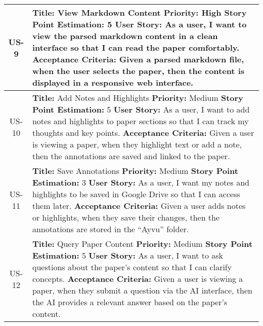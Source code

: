 \documentclass[12pt]{article}
\begin{document}
\begin{longtable}{|c|p{15cm}|}
  \hline
  US-9 &
  \textbf{Title:} View Markdown Content \newline
  \textbf{Priority:} High \newline
  \textbf{Story Point Estimation:} 5 \newline
  \textbf{User Story:} As a user, I want to view the parsed markdown content in a clean interface so that I can read the paper comfortably. \newline
  \textbf{Acceptance Criteria:} Given a parsed markdown file, when the user selects the paper, then the content is displayed in a responsive web interface. \\

  \hline
  US-10 &
  \textbf{Title:} Add Notes and Highlights \newline
  \textbf{Priority:} Medium \newline
  \textbf{Story Point Estimation:} 5 \newline
  \textbf{User Story:} As a user, I want to add notes and highlights to paper sections so that I can track my thoughts and key points. \newline
  \textbf{Acceptance Criteria:} Given a user is viewing a paper, when they highlight text or add a note, then the annotations are saved and linked to the paper. \\

  \hline
  US-11 &
  \textbf{Title:} Save Annotations \newline
  \textbf{Priority:} Medium \newline
  \textbf{Story Point Estimation:} 3 \newline
  \textbf{User Story:} As a user, I want my notes and highlights to be saved in Google Drive so that I can access them later. \newline
  \textbf{Acceptance Criteria:} Given a user adds notes or highlights, when they save their changes, then the annotations are stored in the ``Ayvu'' folder. \\

  \hline
  US-12 &
  \textbf{Title:} Query Paper Content \newline
  \textbf{Priority:} Medium \newline
  \textbf{Story Point Estimation:} 5 \newline
  \textbf{User Story:} As a user, I want to ask questions about the paper's content so that I can clarify concepts. \newline
  \textbf{Acceptance Criteria:} Given a user is viewing a paper, when they submit a question via the AI interface, then the AI provides a relevant answer based on the paper's content. \\


\end{longtable}
\end{document}
